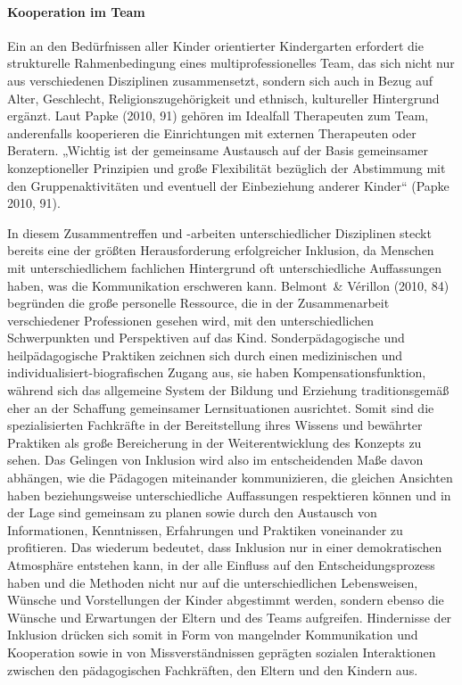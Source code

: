 \paragraph{Kooperation im Team}\label{Team}

Ein an den Bedürfnissen aller Kinder orientierter Kindergarten erfordert die strukturelle Rahmenbedingung eines multiprofessionelles Team, das sich nicht nur aus verschiedenen Disziplinen zusammensetzt, sondern sich auch in Bezug auf Alter, Geschlecht, Religionszugehörigkeit und ethnisch, kultureller Hintergrund ergänzt.
Laut Papke (2010, 91) gehören im Idealfall Therapeuten zum Team, anderenfalls kooperieren die Einrichtungen mit externen Therapeuten oder Beratern. „Wichtig ist der gemeinsame Austausch auf der Basis gemeinsamer konzeptioneller Prinzipien und große Flexibilität bezüglich der Abstimmung mit den Gruppenaktivitäten und eventuell der Einbeziehung anderer Kinder“ (Papke 2010, 91).

In diesem Zusammentreffen und -arbeiten unterschiedlicher Disziplinen steckt bereits eine der größten Herausforderung erfolgreicher Inklusion, da Menschen mit unterschiedlichem fachlichen Hintergrund  oft unterschiedliche Auffassungen haben, was die Kommunikation erschweren kann. 
Belmont~\& Vérillon (2010, 84) begründen die große personelle Ressource, die in der Zusammenarbeit verschiedener Professionen  gesehen wird, mit den unterschiedlichen Schwerpunkten und Perspektiven auf das Kind. Sonderpädagogische und heilpädagogische Praktiken zeichnen sich durch einen medizinischen und individualisiert-biografischen Zugang aus, sie haben Kompensationsfunktion, während sich das allgemeine System der Bildung und Erziehung traditionsgemäß eher an der Schaffung gemeinsamer Lernsituationen ausrichtet. Somit sind die spezialisierten Fachkräfte in der Bereitstellung ihres Wissens und bewährter Praktiken als große Bereicherung in der Weiterentwicklung des Konzepts zu sehen.
Das Gelingen von Inklusion wird also im entscheidenden Maße davon abhängen, wie die Pädagogen miteinander kommunizieren, die gleichen Ansichten haben beziehungsweise unterschiedliche Auffassungen respektieren können und in der Lage sind gemeinsam zu planen sowie durch den Austausch von Informationen, Kenntnissen, Erfahrungen und Praktiken voneinander zu profitieren. Das wiederum bedeutet, dass Inklusion nur in einer demokratischen Atmosphäre entstehen kann, in der alle Einfluss auf den Entscheidungsprozess haben und die Methoden nicht nur auf die unterschiedlichen Lebensweisen, Wünsche und Vorstellungen der Kinder abgestimmt werden, sondern ebenso die Wünsche und Erwartungen der Eltern und des Teams aufgreifen.
Hindernisse der Inklusion drücken sich somit in Form von mangelnder Kommunikation und Kooperation sowie in von Missverständnissen geprägten sozialen Interaktionen zwischen den pädagogischen Fachkräften, den Eltern und den Kindern aus.

